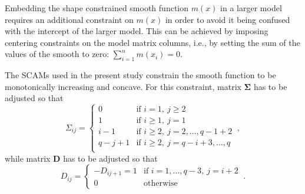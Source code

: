 Embedding the shape constrained smooth function \(m(x)\) in a larger model requires an additional constraint on \(m(x)\) in order to avoid it being confused with the intercept of the larger model.  This can be achieved by imposing centering constraints on the model matrix columns, i.e., by setting the sum of the values of the smooth to zero: \(\sum_{i = 1}^n m(x_i) = 0\).

The SCAMs used in the present study constrain the smooth function to be monotonically increasing and concave.  For this constraint, matrix \(\symbf{\Sigma}\) has to be adjusted so that
\begin{equation}
  \label{eq:SCAMSigmaMonotoneIncreasingConcave}
  \Sigma_{i j} =
  \begin{cases}
    0 &\text{if } i = 1,~ j \geq 2 \\
    1 &\text{if } i \geq 1,~ j = 1 \\
    i - 1 &\text{if } i \geq 2,~ j = 2, \ldots, q - 1 + 2 \\
    q - j + 1 &\text{if } i \geq 2,~ j = q - i + 3, \ldots, q\\
  \end{cases}~,
\end{equation}
while matrix \(\symbf{D}\) has to be adjusted so that
\begin{equation}
  \label{eq:SCAMDMonotoneIncreasingConcave}
  D_{i j} = 
  \begin{cases}
    - D_{i j + 1} = 1 &\text{if } i = 1, \ldots, q - 3,~ j = i + 2 \\
    0 &\text{otherwise}
  \end{cases}~.
\end{equation}

